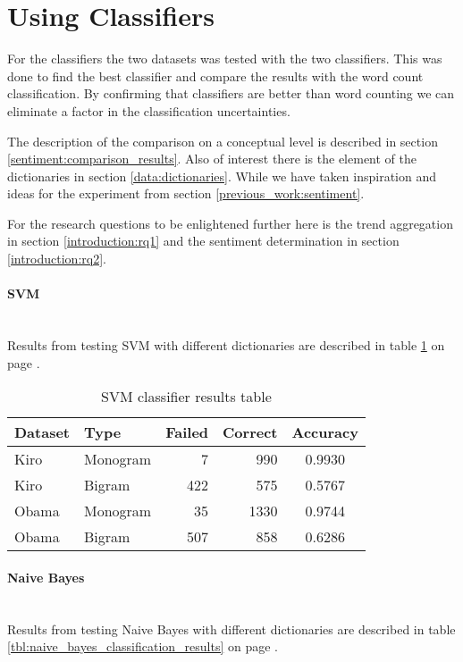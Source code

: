 \section{Using Classifiers}\label{experiments:calssifiers}
For the classifiers the two datasets was tested with the two classifiers.
This was done to find the best classifier and compare the results
with the word count classification. By confirming that classifiers are better
than word counting we can eliminate a factor in the classification
uncertainties. 

The description of the comparison on a conceptual level is described in section
\ref{sentiment:comparison_results}. Also of interest there is the element of
the dictionaries in section \ref{data:dictionaries}. While we have taken
inspiration and ideas for the experiment from section
\ref{previous_work:sentiment}.

For the research questions to be enlightened further here is the trend
aggregation in section \ref{introduction:rq1} and the sentiment determination
in section \ref{introduction:rq2}.

\paragraph{SVM}\label{experiments:svm_classification}
\hspace{0pt}\\
Results from testing SVM with different dictionaries are described in table
\ref{tbl:svm_classifier_results} on page
\pageref{tbl:svm_classifier_results}.

\begin{table}
\centering
\label{tbl:svm_classifier_results}
\caption{SVM classifier results table}
\begin{tabular}{ l l r r c }
Dataset & Type & Failed & Correct & Accuracy \\
\hline
Kiro & Monogram & 7 & 990 & 0.9930 \\
Kiro & Bigram & 422 & 575 & 0.5767 \\
Obama & Monogram & 35 & 1330 & 0.9744 \\
Obama & Bigram & 507 & 858 & 0.6286 \\
\end{tabular}
\end{table}

\paragraph{Naive Bayes}\label{experiments:naive_bayes_classification}
\hspace{0pt}\\
Results from testing Naive Bayes with different dictionaries are described in
table \ref{tbl:naive_bayes_classification_results} on page
\pageref{tbl:naive_bayes_classification_results}.

